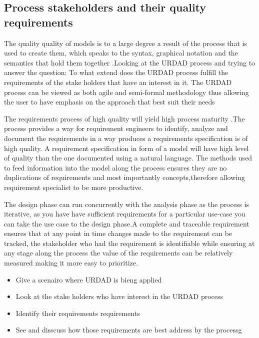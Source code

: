 
\subsection{Process stakeholders and their quality requirements}

The quality quality of models is to a large degree a result of the process that is used to create them, which speaks to the syntax,
 graphical notation and the semantics that hold them together \cite {bobkowska_integrating_2009}.Looking at the URDAD process and trying to answer the 
question: To what extend does the URDAD process fulfill the requirements of the stake holders that have an interest in it. The URDAD process 
can be viewed as both agile and semi-formal methodology thus allowing the user to have emphasis on the approach that best suit their needs \cite {solms_urdad_2010}

The requirements process of high quality will yield high process maturity \cite  {boehm_view_2006}.The process provides a  way for requirement engineers to identify, analyze and document 
the requirements in a way produces a requirements specification is of high quality. A requirement specification in form of a model will 
have high level of quality than the one documented using a natural language. The methods used to feed information into the model along the process 
ensures they are no duplications of requirements and most importantly concepts,therefore allowing requirement specialist to be more productive. 


The design phase can run concurrently with the analysis phase as the process is iterative, as you have have sufficient requirements for a 
particular use-case you can take the use case to the design phase.A complete and traceable requirement ensures that at any point in time
changes made to the requirement can be tracked, the stakeholder who had the requirement is identifiable while ensuring at any stage along 
the process the value of the requirements can be relatively measured making it more easy to prioritize.\cite {gilb_paper:_2010}

\begin {itemize}
 \item Give a scenairo where URDAD is bieng applied
 \item Look at the stake holders who have interest in the URDAD process 
 \item Identify their requirements requirements
 \item See and disscuss how those requirements are best address by the processg
\end {itemize}

